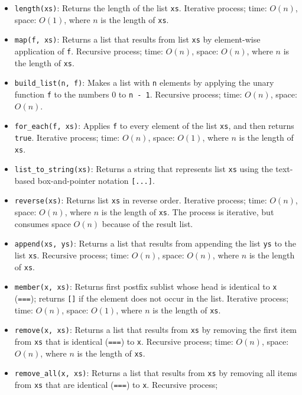 \begin{itemize}
\item \lstinline{length(xs)}: Returns the length of the list
  \lstinline{xs}. 
Iterative process; time: $O(n)$, space: $O(1)$, where $n$ is the length of \lstinline{xs}.
\item \lstinline{map(f, xs)}: Returns a list that results from list
  \lstinline{xs} by element-wise application of \lstinline{f}. 
Recursive process; time: $O(n)$, space: $O(n)$, where $n$ is the length of \lstinline{xs}.
\item \lstinline{build_list(n, f)}: Makes a list with \lstinline{n}
elements by applying the unary function \lstinline{f} to the numbers 0 to \lstinline{n - 1}.
Recursive process; time: $O(n)$, space: $O(n)$.
\item \lstinline{for_each(f, xs)}: Applies \lstinline{f} to every
  element of the list \lstinline{xs}, and then returns
  \lstinline{true}. 
Iterative process; time: $O(n)$, space: $O(1)$, where $n$ is the length of \lstinline{xs}.
\item \lstinline{list_to_string(xs)}: Returns a string that represents
list \lstinline{xs} using the text-based box-and-pointer notation \lstinline{[...]}.
\item \lstinline{reverse(xs)}: Returns list \lstinline{xs} in reverse
  order. Iterative process; time: $O(n)$, space: $O(n)$, where $n$ is the length of \lstinline{xs}.
The process is iterative, but consumes space $O(n)$ because of the result list.
\item \lstinline{append(xs, ys)}: Returns a list that results from 
appending the list \lstinline{ys} to the list \lstinline{xs}.
Recursive process; time: $O(n)$, space: $O(n)$, where $n$ is the length of \lstinline{xs}.
\item \lstinline{member(x, xs)}: Returns first postfix sublist
whose head is identical to
\lstinline{x} (\lstinline{===}); returns \lstinline{[]} if the
element does not occur in the list.
Iterative process; time: $O(n)$, space: $O(1)$, where $n$ is the length of \lstinline{xs}.
\item \lstinline{remove(x, xs)}: Returns a list that results from
\lstinline{xs} by removing the first item from \lstinline{xs} that
is identical (\lstinline{===}) to \lstinline{x}. Recursive process;
time: $O(n)$, space: $O(n)$, where $n$ is the length of \lstinline{xs}.
\item \lstinline{remove_all(x, xs)}: Returns a list that results from
\lstinline{xs} by removing all items from \lstinline{xs} that
are identical (\lstinline{===}) to \lstinline{x}.
Recursive process;

\end{itemize}
